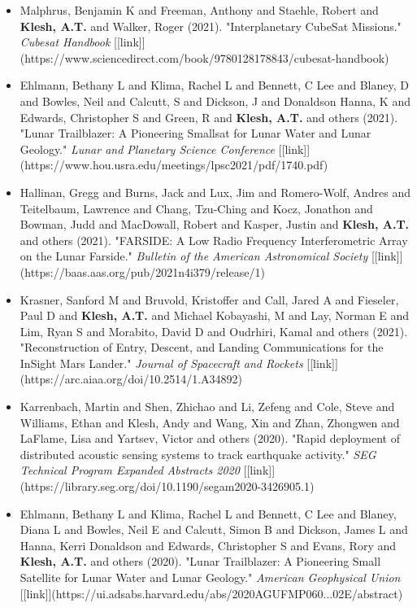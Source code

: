 \documentclass[11pt,letterpaper]{article}
\begin{document}
\begin{itemize}
\item Malphrus, Benjamin K and Freeman, Anthony and Staehle, Robert and \textbf{Klesh, A.T.} and Walker, Roger (2021). "Interplanetary CubeSat Missions." \textit{Cubesat Handbook} [[link]](https://www.sciencedirect.com/book/9780128178843/cubesat-handbook)
\item Ehlmann, Bethany L and Klima, Rachel L and Bennett, C Lee and Blaney, D and Bowles, Neil and Calcutt, S and Dickson, J and Donaldson Hanna, K and Edwards, Christopher S and Green, R and \textbf{Klesh, A.T.} and others (2021). "Lunar Trailblazer: A Pioneering Smallsat for Lunar Water and Lunar Geology." \textit{Lunar and Planetary Science Conference} [[link]](https://www.hou.usra.edu/meetings/lpsc2021/pdf/1740.pdf)
\item Hallinan, Gregg and Burns, Jack and Lux, Jim and Romero-Wolf, Andres and Teitelbaum, Lawrence and Chang, Tzu-Ching and Kocz, Jonathon and Bowman, Judd and MacDowall, Robert and Kasper, Justin and \textbf{Klesh, A.T.} and others (2021). "FARSIDE: A Low Radio Frequency Interferometric Array on the Lunar Farside." \textit{Bulletin of the American Astronomical Society} [[link]](https://baas.aas.org/pub/2021n4i379/release/1)
\item Krasner, Sanford M and Bruvold, Kristoffer and Call, Jared A and Fieseler, Paul D and \textbf{Klesh, A.T.} and Michael Kobayashi, M and Lay, Norman E and Lim, Ryan S and Morabito, David D and Oudrhiri, Kamal and others (2021). "Reconstruction of Entry, Descent, and Landing Communications for the InSight Mars Lander." \textit{Journal of Spacecraft and Rockets} [[link]](https://arc.aiaa.org/doi/10.2514/1.A34892)
\item Karrenbach, Martin and Shen, Zhichao and Li, Zefeng and Cole, Steve and Williams, Ethan and Klesh, Andy and Wang, Xin and Zhan, Zhongwen and LaFlame, Lisa and Yartsev, Victor and others (2020). "Rapid deployment of distributed acoustic sensing systems to track earthquake activity." \textit{SEG Technical Program Expanded Abstracts 2020} [[link]](https://library.seg.org/doi/10.1190/segam2020-3426905.1)
\item Ehlmann, Bethany L and Klima, Rachel L and Bennett, C Lee and Blaney, Diana L and Bowles, Neil E and Calcutt, Simon B and Dickson, James L and Hanna, Kerri Donaldson and Edwards, Christopher S and Evans, Rory and \textbf{Klesh, A.T.} and others (2020). "Lunar Trailblazer: A Pioneering Small Satellite for Lunar Water and Lunar Geology." \textit{American Geophysical Union} [[link]](https://ui.adsabs.harvard.edu/abs/2020AGUFMP060...02E/abstract)

\end{itemize}
\end{document}
